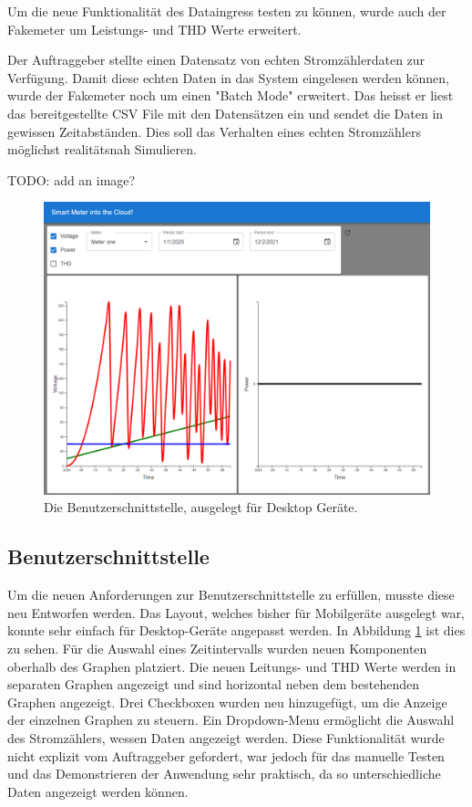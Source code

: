 Um die neue Funktionalität des Dataingress testen zu können, wurde auch der
Fakemeter um Leistungs- und \ac{THD} Werte erweitert.

Der Auftraggeber stellte einen Datensatz von echten Stromzählerdaten
zur Verfügung. Damit diese echten Daten in das System eingelesen werden können,
wurde der Fakemeter noch um einen "Batch Mode" erweitert. Das heisst
er liest das bereitgestellte CSV File mit den Datensätzen ein und sendet die Daten in
gewissen Zeitabständen. Dies soll das Verhalten eines echten Stromzählers
möglichst realitätsnah Simulieren.

TODO: add an image?

\begin{figure}[H]
    \centering
    \includegraphics[width=1.0\textwidth]{gfx/phase2}
    \caption{
        Die Benutzerschnittstelle, ausgelegt für Desktop Geräte.
    }
    \label{fig:phase2-ui}
\end{figure}

\subsection{Benutzerschnittstelle}
Um die neuen Anforderungen zur Benutzerschnittstelle zu erfüllen, musste diese neu Entworfen werden.
Das Layout, welches bisher für Mobilgeräte ausgelegt war, konnte sehr einfach für Desktop-Geräte angepasst werden.
In Abbildung \ref{fig:phase2-ui} ist dies zu sehen.
Für die Auswahl eines Zeitintervalls wurden neuen Komponenten oberhalb des Graphen platziert.
Die neuen Leitungs- und \ac{THD} Werte werden in separaten Graphen angezeigt und sind horizontal neben dem bestehenden Graphen angezeigt.
Drei Checkboxen wurden neu hinzugefügt, um die Anzeige der einzelnen Graphen zu steuern.
Ein Dropdown-Menu ermöglicht die Auswahl des Stromzählers, wessen Daten angezeigt werden.
Diese Funktionalität wurde nicht explizit vom Auftraggeber gefordert, war jedoch für das manuelle Testen
und das Demonstrieren der Anwendung sehr praktisch, da so unterschiedliche Daten angezeigt werden können.

